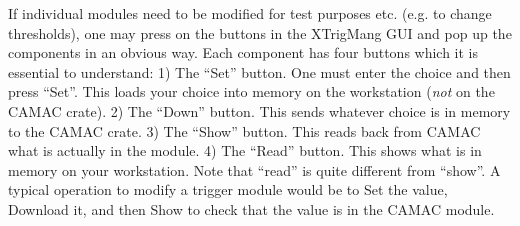 \par
If individual modules need to be modified
for test purposes etc. (e.g. to change thresholds),
one may press on the buttons in the XTrigMang
GUI and pop up the components in an obvious way.
Each component has four buttons which it is
essential to understand: 
\hskip 0.05in
1) The ``Set'' button.  One must enter the choice
and then press ``Set''.  This loads your choice
into memory on the workstation ({\it not} on 
the CAMAC crate).
\hskip 0.05in
2) The ``Down'' button.  This sends whatever choice
is in memory to the CAMAC crate.
\hskip 0.05in
3) The ``Show'' button.  This reads back from CAMAC
what is actually in the module.
\hskip 0.05in
4) The ``Read'' button.  This shows what is in
memory on your workstation.  Note that ``read'' is quite 
different from ``show''.
A typical operation to modify a trigger module
would be to Set the value,
Download it, and then Show to check that the value
is in the CAMAC module.  

%
